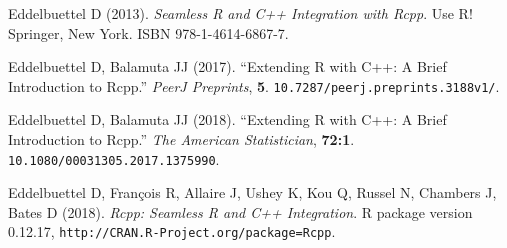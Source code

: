 \begin{thebibliography}{3}
\newcommand{\enquote}[1]{``#1''}
\providecommand{\natexlab}[1]{#1}
\providecommand{\url}[1]{\texttt{#1}}
\providecommand{\urlprefix}{URL }
\providecommand{\doi}[1]{doi:\discretionary{}{}{}#1}
\providecommand{\eprint}[2][]{\url{#2}}

Eddelbuettel D (2013).
\newblock \emph{Seamless R and C++ Integration with Rcpp}.
\newblock Use R! Springer, New York.
\newblock ISBN 978-1-4614-6867-7.

Eddelbuettel D, Balamuta JJ (2017).
\newblock \enquote{Extending R with C++: A Brief Introduction to Rcpp.}
\newblock \emph{PeerJ Preprints}, \textbf{5}.
\newblock \url{10.7287/peerj.preprints.3188v1/}.

Eddelbuettel D, Balamuta JJ (2018).
\newblock \enquote{Extending R with C++: A Brief Introduction to Rcpp.}
\newblock \emph{The American Statistician}, \textbf{72:1}.
\newblock \url{10.1080/00031305.2017.1375990}.

Eddelbuettel D, Fran\c{c}ois R, Allaire J, Ushey K, Kou Q, Russel N, Chambers
  J, Bates D (2018).
\newblock \emph{{Rcpp}: Seamless {R} and {C++} Integration}.
\newblock R package version 0.12.17,
\url{http://CRAN.R-Project.org/package=Rcpp}.

\end{thebibliography}
